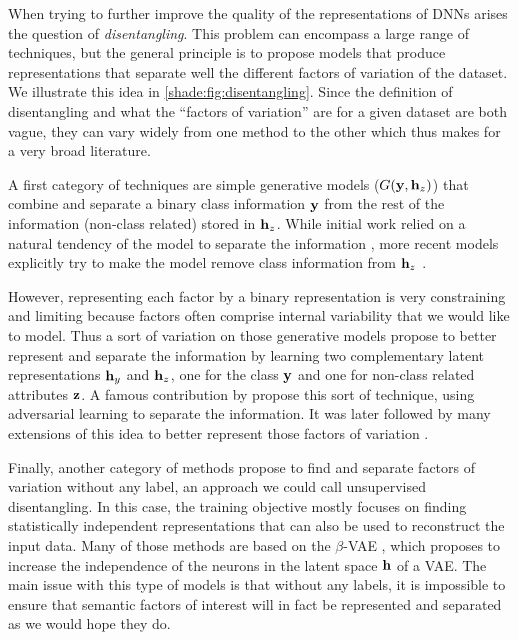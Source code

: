 When trying to further improve the quality of the representations of \acp{DNN} arises the question of \textit{disentangling}. This problem can encompass a large range of techniques, but the general principle is to propose models that produce representations that separate well the different factors of variation of the dataset. We illustrate this idea in \autoref{shade:fig:disentangling}. Since the definition of disentangling \citep{higgins2018towards} and what the ``factors of variation'' are for a given dataset are both vague, they can vary widely from one method to the other which thus makes for a very broad literature.

A first category of techniques are simple generative models ($G(\mathbf{y}, \mathbf{h}_z)$) that combine and separate a binary class information $\mathbf{y}$ from the rest of the information (non-class related) stored in $\mathbf{h}_z$. While initial work relied on a natural tendency of the model to separate the information \citep{cheung2014discovering,perarnau2016invertible}, more recent models explicitly try to make the model remove class information from $\mathbf{h}_z$ \citep{Lample2017,Liu2018}.

However, representing each factor by a binary representation is very constraining and limiting because factors often comprise internal variability that we would like to model. Thus a sort of variation on those generative models propose to better represent and separate the information by learning two complementary latent representations $\mathbf{h}_y$ and $\mathbf{h}_z$, one for the class $\mathbf{y}$ and one for non-class related attributes $\mathbf{z}$. A famous contribution by \citet{Mathieu2016} propose this sort of technique, using adversarial learning \citep{Goodfellow2014} to separate the information. It was later followed by many extensions of this idea to better represent those factors of variation \citep{peng2017reconstruction,Jaiswal2018,Liu2018a}.

Finally, another category of methods propose to find and separate factors of variation without any label, an approach we could call unsupervised disentangling. In this case, the training objective mostly focuses on finding statistically independent representations that can also be used to reconstruct the input data. Many of those methods are based on the $\beta$-\acs{VAE} \citep{higgins2017beta,chen2018isolating}, which proposes to increase the independence of the neurons in the latent space $\mathbf{h}$ of a \acs{VAE}. The main issue with this type of models is that without any labels, it is impossible to ensure that semantic factors of interest will in fact be represented and separated as we would hope they do.

